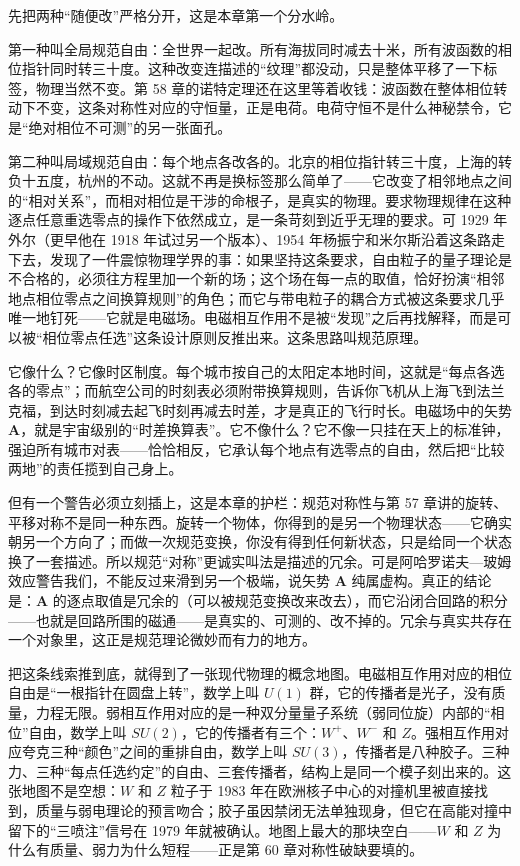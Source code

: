 \begin{mainline}
先把两种“随便改”严格分开，这是本章第一个分水岭。

第一种叫全局规范自由：全世界一起改。所有海拔同时减去十米，所有波函数的相位指针同时转三十度。这种改变连描述的“纹理”都没动，只是整体平移了一下标签，物理当然不变。第 58 章的诺特定理还在这里等着收钱：波函数在整体相位转动下不变，这条对称性对应的守恒量，正是电荷。电荷守恒不是什么神秘禁令，它是“绝对相位不可测”的另一张面孔。

第二种叫局域规范自由：每个地点各改各的。北京的相位指针转三十度，上海的转负十五度，杭州的不动。这就不再是换标签那么简单了——它改变了相邻地点之间的“相对关系”，而相对相位是干涉的命根子，是真实的物理。要求物理规律在这种逐点任意重选零点的操作下依然成立，是一条苛刻到近乎无理的要求。可 1929 年外尔（更早他在 1918 年试过另一个版本）、1954 年杨振宁和米尔斯沿着这条路走下去，发现了一件震惊物理学界的事：如果坚持这条要求，自由粒子的量子理论是不合格的，必须往方程里加一个新的场；这个场在每一点的取值，恰好扮演“相邻地点相位零点之间换算规则”的角色；而它与带电粒子的耦合方式被这条要求几乎唯一地钉死——它就是电磁场。电磁相互作用不是被“发现”之后再找解释，而是可以被“相位零点任选”这条设计原则反推出来。这条思路叫规范原理。

它像什么？它像时区制度。每个城市按自己的太阳定本地时间，这就是“每点各选各的零点”；而航空公司的时刻表必须附带换算规则，告诉你飞机从上海飞到法兰克福，到达时刻减去起飞时刻再减去时差，才是真正的飞行时长。电磁场中的矢势 \(\mathbf A\)，就是宇宙级别的“时差换算表”。它不像什么？它不像一只挂在天上的标准钟，强迫所有城市对表——恰恰相反，它承认每个地点有选零点的自由，然后把“比较两地”的责任揽到自己身上。

但有一个警告必须立刻插上，这是本章的护栏：规范对称性与第 57 章讲的旋转、平移对称不是同一种东西。旋转一个物体，你得到的是另一个物理状态——它确实朝另一个方向了；而做一次规范变换，你没有得到任何新状态，只是给同一个状态换了一套描述。所以规范“对称”更诚实叫法是描述的冗余。可是阿哈罗诺夫—玻姆效应警告我们，不能反过来滑到另一个极端，说矢势 \(\mathbf A\) 纯属虚构。真正的结论是：\(\mathbf A\) 的逐点取值是冗余的（可以被规范变换改来改去），而它沿闭合回路的积分——也就是回路所围的磁通——是真实的、可测的、改不掉的。冗余与真实共存在一个对象里，这正是规范理论微妙而有力的地方。

把这条线索推到底，就得到了一张现代物理的概念地图。电磁相互作用对应的相位自由是“一根指针在圆盘上转”，数学上叫 \(U(1)\) 群，它的传播者是光子，没有质量，力程无限。弱相互作用对应的是一种双分量量子系统（弱同位旋）内部的“相位”自由，数学上叫 \(SU(2)\)，它的传播者有三个：\(W^{+}\)、\(W^{-}\) 和 \(Z\)。强相互作用对应夸克三种“颜色”之间的重排自由，数学上叫 \(SU(3)\)，传播者是八种胶子。三种力、三种“每点任选约定”的自由、三套传播者，结构上是同一个模子刻出来的。这张地图不是空想：\(W\) 和 \(Z\) 粒子于 1983 年在欧洲核子中心的对撞机里被直接找到，质量与弱电理论的预言吻合；胶子虽因禁闭无法单独现身，但它在高能对撞中留下的“三喷注”信号在 1979 年就被确认。地图上最大的那块空白——\(W\) 和 \(Z\) 为什么有质量、弱力为什么短程——正是第 60 章对称性破缺要填的。


\end{mainline}
